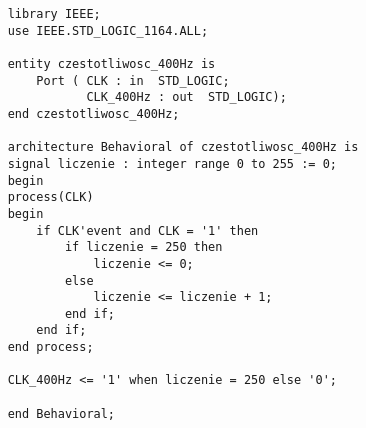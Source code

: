 \begin{lstlisting}
    library IEEE;
    use IEEE.STD_LOGIC_1164.ALL;
    
    entity czestotliwosc_400Hz is
        Port ( CLK : in  STD_LOGIC;
               CLK_400Hz : out  STD_LOGIC);
    end czestotliwosc_400Hz;
    
    architecture Behavioral of czestotliwosc_400Hz is
    signal liczenie : integer range 0 to 255 := 0;
    begin
    process(CLK)
    begin
        if CLK'event and CLK = '1' then
            if liczenie = 250 then
                liczenie <= 0;
            else
                liczenie <= liczenie + 1;
            end if;
        end if;
    end process;
    
    CLK_400Hz <= '1' when liczenie = 250 else '0';
    
    end Behavioral;
\end{lstlisting}